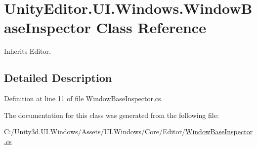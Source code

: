\hypertarget{class_unity_editor_1_1_u_i_1_1_windows_1_1_window_base_inspector}{}\section{Unity\+Editor.\+U\+I.\+Windows.\+Window\+Base\+Inspector Class Reference}
\label{class_unity_editor_1_1_u_i_1_1_windows_1_1_window_base_inspector}


Inherits Editor.



\subsection{Detailed Description}


Definition at line 11 of file Window\+Base\+Inspector.\+cs.



The documentation for this class was generated from the following file\+:\begin{DoxyCompactItemize}
\item 
C\+:/\+Unity3d.\+U\+I.\+Windows/\+Assets/\+U\+I.\+Windows/\+Core/\+Editor/\hyperlink{_window_base_inspector_8cs}{Window\+Base\+Inspector.\+cs}\end{DoxyCompactItemize}
